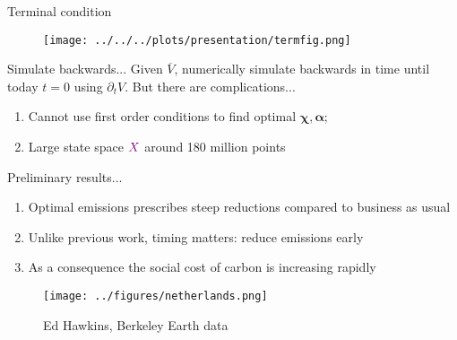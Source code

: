 \documentclass[pdf]{beamer}
\newcommand{\control}[1]{\bm{#1}}
\newcommand{\X}{{\color{violet} X}}
\begin{document}
\begin{frame}{Terminal condition}
    \begin{figure}[H]
        \centering
        \texttt{[image: ../../../plots/presentation/termfig.png]}
    \end{figure}
\end{frame}

\begin{frame}{Simulate backwards...}
    Given $\overline{V}$, numerically simulate backwards in time until today $t = 0$ using $\partial_t V$. But there are complications... \hspace{2em}
    \begin{enumerate}
        \pause \item Cannot use first order conditions to find optimal $\control{\chi}, \control{\alpha}$;
        \pause \item Large state space $\X$ around 180 million points
    \end{enumerate}
\end{frame}

\begin{frame}{Preliminary results...}
    \begin{enumerate}
        \pause \item Optimal emissions prescribes steep reductions compared to business as usual
        \pause \item Unlike previous work, timing matters: reduce emissions early
        \pause \item As a consequence the social cost of carbon is increasing rapidly 
    \end{enumerate}
\end{frame}


\begin{frame}
    \begin{figure}
        \texttt{[image: ../figures/netherlands.png]}
        \caption{Ed Hawkins, Berkeley Earth data}
    \end{figure}
\end{frame}
\end{document}
